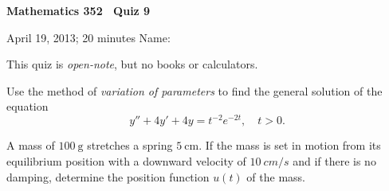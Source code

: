 \documentclass[12pt]{exam}
\begin{document}
\noindent
\textbf{{\large Mathematics 352 \ Quiz 9}}

\noindent
April 19, 2013; 20 minutes \hfill Name: \underline{\hspace{3in}} 

\noindent
This quiz is \emph{open-note}, but no books or calculators. 

\begin{questions} 

\question Use the method of \emph{variation of parameters} to find the general solution of the equation
\[
    y'' + 4y' + 4y = t^{-2} e^{-2t}, \quad t > 0.
\]


\newpage

\question A mass of $\SI{100}{\gram}$ stretches a spring $\SI{5}{\centi\meter}$. If the mass is set in motion from its equilibrium position with a downward velocity of $\SI{10}{cm/s}$ and if there is no damping, determine the position function $u(t)$ of the mass.


\end{questions}
\end{document}
